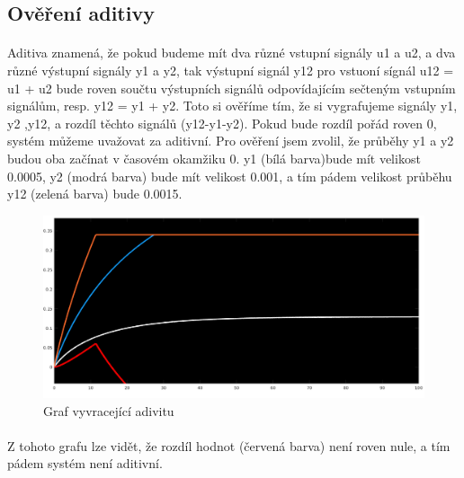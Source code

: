 \documentclass{article}
\begin{document}
	   			   		
	  	\subsection{Ověření aditivy}
	  	\paragraph{}
	  		Aditiva znamená, že pokud budeme mít dva různé vstupní signály u1 a u2, a dva různé výstupní signály y1 a y2, tak výstupní signál y12 pro vstuoní sígnál u12 = u1 + u2 bude roven součtu výstupních signálů odpovídajícím sečteným vstupním signálům, resp. y12 = y1 + y2. Toto si ověříme tím, že si vygrafujeme signály y1, y2 ,y12, a rozdíl těchto signálů (y12-y1-y2). Pokud bude rozdíl pořád roven 0, systém můžeme uvažovat za aditivní. Pro ověření jsem zvolil, že průběhy y1 a y2 budou oba začínat v časovém okamžiku 0. y1 (bílá barva)bude mít velikost 0.0005, y2 (modrá barva) bude mít velikost 0.001, a tím pádem velikost průběhu y12 (zelená barva) bude 0.0015.
	  		
	  		\begin{figure}[H]
	  		\centering
	  		\includegraphics[width=\textwidth]{ukol1aditiv}
	  		\caption{Graf vyvracející adivitu}
	  		\end{figure}
	   		
	   	\paragraph{}
	   	Z tohoto grafu lze vidět, že rozdíl hodnot (červená barva) není roven nule, a tím pádem systém není aditivní.
	   	
\end{document}
